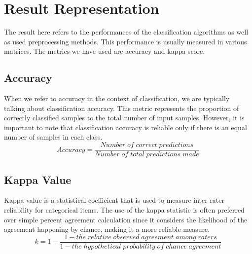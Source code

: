 \documentclass[12pt,a4paper]{report}
\begin{document}
\section{Result Representation}
\justify The result here refers to the performances of the classification algorithms as well as used preprocessing methods. This performance is usually measured in various matrices. The metrics we have used are accuracy and kappa score.
\subsection{Accuracy}
\justify
When we refer to accuracy in the context of classification, we are typically talking about classification accuracy. This metric represents the proportion of correctly classified samples to the total number of input samples. However, it is important to note that classification accuracy is reliable only if there is an equal number of samples in each class.
\begin{equation}
	Accuracy = \frac{Number\; of\;correct\; predictions}{Number\;of\;total\; predictions\;made}
\end{equation}
\subsection{Kappa Value}
\justify Kappa value is a statistical coefficient that is used to measure inter-rater reliability for categorical items\cite{48}. The use of the kappa statistic is often preferred over simple percent agreement calculation since it considers the likelihood of the agreement happening by chance, making it a more reliable measure.
\begin{equation}
	k= 1- \frac{1 -  the\;relative\;observed\;agreement\;among\;raters}{1 - the\; hypothetical\;probability\;of\;chance\;agreement }
\end{equation} 
\end{document}
